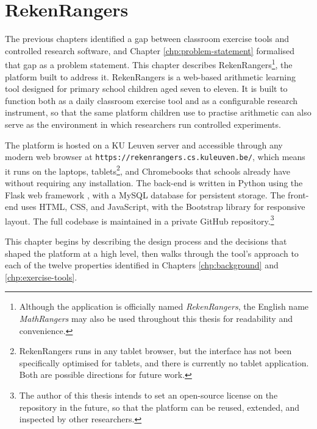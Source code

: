 \chapter{RekenRangers}
\label{chp:rekenrangers}
The previous chapters identified a gap between classroom exercise tools and controlled research software, and Chapter \ref{chp:problem-statement} formalised that gap as a problem statement. This chapter describes RekenRangers\footnote{Although the application is officially named \textit{RekenRangers}, the English name \textit{MathRangers} may also be used throughout this thesis for readability and convenience.}, the platform built to address it. RekenRangers is a web-based arithmetic learning tool designed for primary school children aged seven to eleven. It is built to function both as a daily classroom exercise tool and as a configurable research instrument, so that the same platform children use to practise arithmetic can also serve as the environment in which researchers run controlled experiments.

The platform is hosted on a KU Leuven server and accessible through any modern web browser at \texttt{https://rekenrangers.cs.kuleuven.be/}, which means it runs on the laptops, tablets\footnote{RekenRangers runs in any tablet browser, but the interface has not been specifically optimised for tablets, and there is currently no tablet application. Both are possible directions for future work.}, and Chromebooks that schools already have without requiring any installation. The back-end is written in Python using the Flask web framework \cite{grinberg2018flask}, with a MySQL database for persistent storage. The front-end uses HTML, CSS, and JavaScript, with the Bootstrap library for responsive layout. The full codebase is maintained in a private GitHub repository.\footnote{The author of this thesis intends to set an open-source license on the repository in the future, so that the platform can be reused, extended, and inspected by other researchers.}

This chapter begins by describing the design process and the decisions that shaped the platform at a high level, then walks through the tool's approach to each of the twelve properties identified in Chapters \ref{chp:background} and \ref{chp:exercise-tools}.

